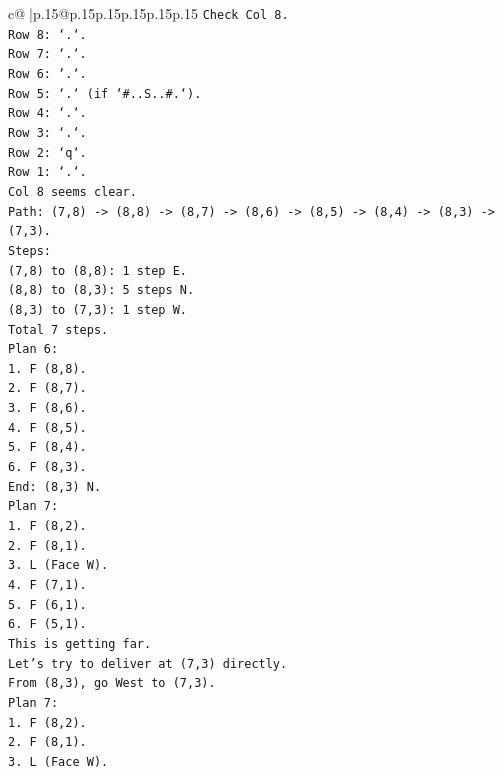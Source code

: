 \documentclass{article}
\begin{document}
{\begin{supertabular}{c@{$\;$}|p{.15\linewidth}@{}p{.15\linewidth}p{.15\linewidth}p{.15\linewidth}p{.15\linewidth}p{.15\linewidth}}
{{{\texttt{Check Col 8.} \\
\texttt{Row 8: `.`.} \\
\texttt{Row 7: `.`.} \\
\texttt{Row 6: `.`.} \\
\texttt{Row 5: `.` (if `\#..S..\#.`).} \\
\texttt{Row 4: `.`.} \\
\texttt{Row 3: `.`.} \\
\texttt{Row 2: `q`.} \\
\texttt{Row 1: `.`.} \\
\texttt{Col 8 seems clear.} \\
\texttt{Path: (7,8) {-}> (8,8) {-}> (8,7) {-}> (8,6) {-}> (8,5) {-}> (8,4) {-}> (8,3) {-}> (7,3).} \\
\texttt{Steps:} \\
\texttt{(7,8) to (8,8): 1 step E.} \\
\texttt{(8,8) to (8,3): 5 steps N.} \\
\texttt{(8,3) to (7,3): 1 step W.} \\
\texttt{Total 7 steps.} \\
\texttt{Plan 6:} \\
\texttt{1. F (8,8).} \\
\texttt{2. F (8,7).} \\
\texttt{3. F (8,6).} \\
\texttt{4. F (8,5).} \\
\texttt{5. F (8,4).} \\
\texttt{6. F (8,3).} \\
\texttt{End: (8,3) N.} \\
\texttt{Plan 7:} \\
\texttt{1. F (8,2).} \\
\texttt{2. F (8,1).} \\
\texttt{3. L (Face W).} \\
\texttt{4. F (7,1).} \\
\texttt{5. F (6,1).} \\
\texttt{6. F (5,1).} \\
\texttt{This is getting far.} \\
\texttt{Let's try to deliver at (7,3) directly.} \\
\texttt{From (8,3), go West to (7,3).} \\
\texttt{Plan 7:} \\
\texttt{1. F (8,2).} \\
\texttt{2. F (8,1).} \\
\texttt{3. L (Face W).} \\
}}}
\end{supertabular}}
\end{document}

